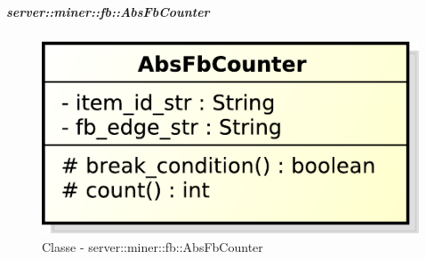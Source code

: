 		\subparagraph{server::miner::fb::AbsFbCounter} %
		\label{subp:server_miner_fb_AbsFbCounter}
		    \begin{figure}[!htbp]
 		 		\centering
 				\centerline{\includegraphics[scale=0.75]{./images/server/classes/miner/abs_fb_counter.pdf}}
 				\caption{Classe - server::miner::fb::AbsFbCounter}
			\end{figure}
